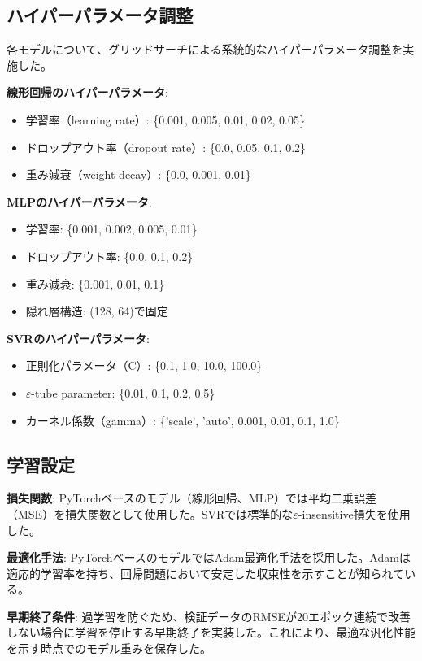 \documentclass[12pt,a4paper,dvipdfmx]{jsarticle}
\begin{document}
\subsection{ハイパーパラメータ調整}

各モデルについて、グリッドサーチによる系統的なハイパーパラメータ調整を実施した。

\textbf{線形回帰のハイパーパラメータ}:
\begin{itemize}
    \item 学習率（learning rate）: \{0.001, 0.005, 0.01, 0.02, 0.05\}
    \item ドロップアウト率（dropout rate）: \{0.0, 0.05, 0.1, 0.2\}
    \item 重み減衰（weight decay）: \{0.0, 0.001, 0.01\}
\end{itemize}

\textbf{MLPのハイパーパラメータ}:
\begin{itemize}
    \item 学習率: \{0.001, 0.002, 0.005, 0.01\}
    \item ドロップアウト率: \{0.0, 0.1, 0.2\}
    \item 重み減衰: \{0.001, 0.01, 0.1\}
    \item 隠れ層構造: (128, 64)で固定
\end{itemize}

\textbf{SVRのハイパーパラメータ}:
\begin{itemize}
    \item 正則化パラメータ（C）: \{0.1, 1.0, 10.0, 100.0\}
    \item $\varepsilon$-tube parameter: \{0.01, 0.1, 0.2, 0.5\}
    \item カーネル係数（gamma）: \{'scale', 'auto', 0.001, 0.01, 0.1, 1.0\}
\end{itemize}

\subsection{学習設定}

\textbf{損失関数}: PyTorchベースのモデル（線形回帰、MLP）では平均二乗誤差（MSE）を損失関数として使用した。SVRでは標準的な$\varepsilon$-insensitive損失を使用した。

\textbf{最適化手法}: PyTorchベースのモデルではAdam最適化手法を採用した。Adamは適応的学習率を持ち、回帰問題において安定した収束性を示すことが知られている。

\textbf{早期終了条件}: 過学習を防ぐため、検証データのRMSEが20エポック連続で改善しない場合に学習を停止する早期終了を実装した。これにより、最適な汎化性能を示す時点でのモデル重みを保存した。
\end{document}
